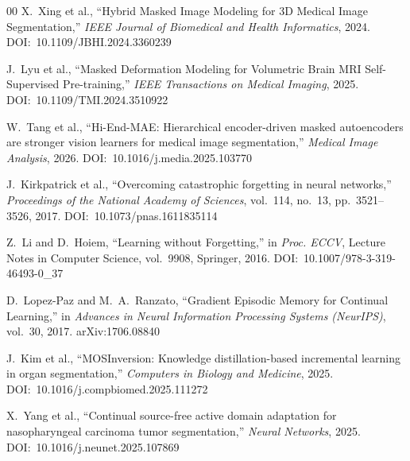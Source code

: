 \documentclass[conference]{IEEEtran}
\begin{document}
\begin{thebibliography}{00}
X.~Xing et al.,
``Hybrid Masked Image Modeling for 3D Medical Image Segmentation,''
\textit{IEEE Journal of Biomedical and Health Informatics}, 2024.
DOI:~10.1109/JBHI.2024.3360239

J.~Lyu et al.,
``Masked Deformation Modeling for Volumetric Brain MRI Self-Supervised Pre-training,''
\textit{IEEE Transactions on Medical Imaging}, 2025.
DOI:~10.1109/TMI.2024.3510922

W.~Tang et al.,
``Hi-End-MAE: Hierarchical encoder-driven masked autoencoders are stronger vision learners for medical image segmentation,''
\textit{Medical Image Analysis}, 2026.
DOI:~10.1016/j.media.2025.103770

J.~Kirkpatrick et al.,
``Overcoming catastrophic forgetting in neural networks,''
\textit{Proceedings of the National Academy of Sciences},
vol.~114, no.~13, pp.~3521--3526, 2017.
DOI:~10.1073/pnas.1611835114

Z.~Li and D.~Hoiem,
``Learning without Forgetting,''
in \textit{Proc. ECCV}, Lecture Notes in Computer Science, vol.~9908,
Springer, 2016. DOI:~10.1007/978-3-319-46493-0\_37

D.~Lopez-Paz and M.~A.~Ranzato,
``Gradient Episodic Memory for Continual Learning,''
in \textit{Advances in Neural Information Processing Systems (NeurIPS)}, vol.~30, 2017.
arXiv:1706.08840

J.~Kim et al.,
``MOSInversion: Knowledge distillation-based incremental learning in organ segmentation,''
\textit{Computers in Biology and Medicine}, 2025.
DOI:~10.1016/j.compbiomed.2025.111272

X.~Yang et al.,
``Continual source-free active domain adaptation for nasopharyngeal carcinoma tumor segmentation,''
\textit{Neural Networks}, 2025.
DOI:~10.1016/j.neunet.2025.107869

\end{thebibliography}
\end{document}

